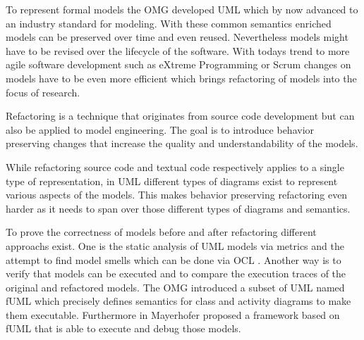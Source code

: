 \documentclass{llncs}
\begin{document}

To represent formal models the OMG developed UML \cite{man:UML} which by now advanced to an industry standard for 
modeling. With these common semantics enriched models can be preserved over time and even reused. Nevertheless models 
might have to be revised over the lifecycle of the software. With todays trend to more agile software 
development such as eXtreme Programming \cite{DBLP:journals/computer/Beck99} or Scrum \cite{DBLP:journals/software/RisingJ00} 
changes on models have to be even more efficient which brings refactoring of models into the focus of research.


Refactoring is a technique that originates from source code development but can also be applied to model engineering.
The goal is to introduce behavior preserving changes \cite{mast:REFOOF} that increase the quality and understandability
of the models.


While refactoring source code and textual code respectively applies to a single type of representation, in UML different
types of diagrams exist to represent various aspects of the models. This makes behavior preserving refactoring even harder 
as it needs to span over those different types of diagrams and semantics.


To prove the correctness of models before and after refactoring different approachs exist. One is the static analysis of
UML models via metrics and the attempt to find model smells \cite{DBLP:conf/models/ArendtTW13} which can be done via
OCL \cite{man:OCL}. Another way is to verify that models can be executed and to compare the execution traces of the 
original and refactored models. The OMG introduced a subset 
of UML named fUML \cite{man:FUML} which precisely defines semantics for class and activity diagrams to make them 
executable. 
Furthermore in \cite{DBLP:conf/icse/Mayerhofer12} Mayerhofer proposed a framework based on fUML that is able to execute
and debug those models.
\end{document}
